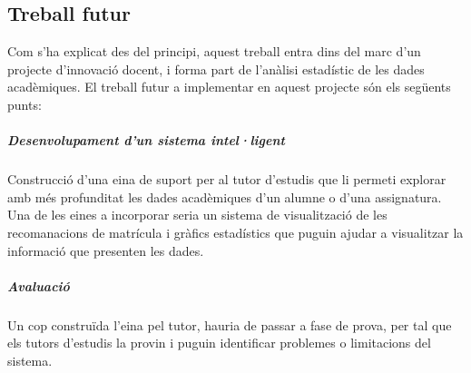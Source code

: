 \documentclass[12pt,a4paper,catalan]{article}
\begin{document}
\subsection{Treball futur}
Com s'ha explicat des del principi, aquest treball entra dins del marc d'un projecte d'innovació docent, i forma part de l'anàlisi estadístic de les dades acadèmiques. El treball futur a implementar en aquest projecte són els següents punts:

\subparagraph{Desenvolupament d'un sistema intel·ligent} 
Construcció d'una eina de suport per al tutor d'estudis que li permeti explorar amb més profunditat les dades acadèmiques d'un alumne o d'una assignatura. Una de les eines a incorporar seria un sistema de visualització de les recomanacions de matrícula i gràfics estadístics que puguin ajudar a visualitzar la informació que presenten les dades.

\subparagraph{Avaluació}
Un cop construïda l'eina pel tutor, hauria de passar a fase de prova, per tal que els tutors d'estudis la provin i puguin identificar problemes o limitacions del sistema.

\newpage
\end{document}
